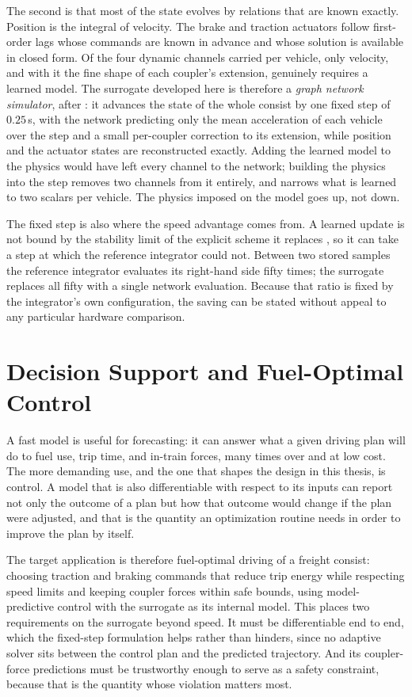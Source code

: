 The second is that most of the state evolves by relations that are known exactly. Position is the integral of velocity. The brake and traction actuators follow first-order lags whose commands are known in advance and whose solution is available in closed form. Of the four dynamic channels carried per vehicle, only velocity, and with it the fine shape of each coupler's extension, genuinely requires a learned model. The surrogate developed here is therefore a \emph{graph network simulator}, after \cite{sanchez2020gns}: it advances the state of the whole consist by one fixed step of $0.25$\,s, with the network predicting only the mean acceleration of each vehicle over the step and a small per-coupler correction to its extension, while position and the actuator states are reconstructed exactly. Adding the learned model to the physics would have left every channel to the network; building the physics into the step removes two channels from it entirely, and narrows what is learned to two scalars per vehicle. The physics imposed on the model goes up, not down.

The fixed step is also where the speed advantage comes from. A learned update is not bound by the stability limit of the explicit scheme it replaces \cite{stachenfeld2022coarse}, so it can take a step at which the reference integrator could not. Between two stored samples the reference integrator evaluates its right-hand side fifty times; the surrogate replaces all fifty with a single network evaluation. Because that ratio is fixed by the integrator's own configuration, the saving can be stated without appeal to any particular hardware comparison.

\section{Decision Support and Fuel-Optimal Control}

A fast model is useful for forecasting: it can answer what a given driving plan will do to fuel use, trip time, and in-train forces, many times over and at low cost. The more demanding use, and the one that shapes the design in this thesis, is control. A model that is also differentiable with respect to its inputs can report not only the outcome of a plan but how that outcome would change if the plan were adjusted, and that is the quantity an optimization routine needs in order to improve the plan by itself.

The target application is therefore fuel-optimal driving of a freight consist: choosing traction and braking commands that reduce trip energy while respecting speed limits and keeping coupler forces within safe bounds, using model-predictive control with the surrogate as its internal model. This places two requirements on the surrogate beyond speed. It must be differentiable end to end, which the fixed-step formulation helps rather than hinders, since no adaptive solver sits between the control plan and the predicted trajectory. And its coupler-force predictions must be trustworthy enough to serve as a safety constraint, because that is the quantity whose violation matters most.

